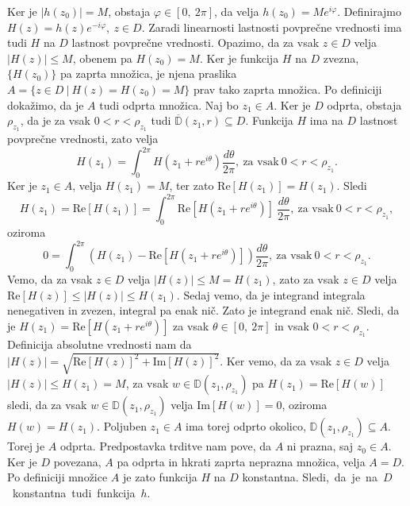 \documentclass[mat1, tisk]{fmfdelo}
\begin{document}
    \begin{dokaz}
        Ker je $|h(z_0)| = M$, obstaja $\varphi \in [0,~2\pi]$, da velja \mbox{$h(z_0) = M e^{i \varphi}$}.
        Definirajmo $H(z) = h(z) e^{-i\varphi},~z \in D$. Zaradi linearnosti lastnosti povprečne vrednosti ima tudi $H$ na $D$ lastnost povprečne vrednosti. Opazimo, da za vsak $z \in D$ velja $|H(z)|  \leq M$, obenem pa \mbox{$H(z_0) = M$}.
        Ker je funkcija $H$ na $D$ zvezna, $\{H(z_0)\}$ pa zaprta množica, je njena praslika \mbox{$A = \{z \in D~|~H(z) = H(z_0) = M\}$} prav tako zaprta množica. Po definiciji dokažimo, da je $A$ tudi odprta množica. 
        Naj bo $z_1 \in A$. Ker je $D$ odprta, obstaja $\rho_{z_1}$, da je za vsak $0 < r < \rho_{z_1}$ tudi $\overline{\mathbb{D}}(z_1, r) \subseteq D$. 
        Funkcija $H$ ima na $D$ lastnost povprečne vrednosti, zato velja
        $$
            H(z_1) = \int_{0}^{2\pi}{H(z_1 + re^{i\theta}) \frac{d\theta}{2\pi}},~\text{za vsak}~0<r<\rho_{z_1}.
        $$
        Ker je $z_1 \in A$, velja $H(z_1) = M$, ter zato $\text{Re}[H(z_1)] = H(z_1)$. 
        Sledi
        $$
        H(z_1) = \text{Re}[H(z_1)] = \int_{0}^{2\pi}{\text{Re}[H(z_1 + re^{i\theta})]~\frac{d\theta}{2\pi}},~\text{za vsak}~0<r<\rho_{z_1},
        $$
        oziroma
        $$
        0 = \int_{0}^{2\pi}{\left(H(z_1) - \text{Re}[H(z_1 + re^{i\theta})] \right)\frac{d\theta}{2\pi}},~\text{za vsak}~0<r<\rho_{z_1}.
        $$
        Vemo, da za vsak $z \in D$ velja $|H(z)| \leq M = H(z_1)$, zato za vsak $z \in D$ velja $\text{Re}[H(z)] \leq |H(z)| \leq H(z_1)$.
        Sedaj vemo, da je integrand integrala nenegativen in zvezen, integral pa enak nič. Zato je integrand enak nič. 
        Sledi, da je \mbox{$H(z_1) = \text{Re}[H(z_1 + r e^{i \theta})]$} za vsak $\theta \in [0,~2\pi]$ in vsak $0 < r < \rho_{z_1}$. Definicija absolutne vrednosti nam da $|H(z)| = \sqrt{\text{Re}[H(z)]^2 + \text{Im}[H(z)]^2}$. 
        Ker vemo, da za vsak $z \in D$ velja $|H(z)| \leq H(z_1) = M$, za vsak $w \in \mathbb{D}(z_1,\rho_{z_1})$ pa $H(z_1) = \text{Re}[H(w)]$ sledi, da za vsak $w \in \mathbb{D}(z_1,\rho_{z_1})$ velja $\text{Im}[H(w)] = 0$, oziroma $H(w) = H(z_1)$. 
        Poljuben $z_1 \in A$ ima torej odprto okolico, $ \mathbb{D}(z_1, \rho_{z_1}) \subseteq A$. Torej je $A$ odprta.
        Predpostavka trditve nam pove, da $A$ ni prazna, saj $z_0 \in A$. Ker je $D$ povezana, $A$ pa odprta in hkrati zaprta neprazna množica, velja $A = D$. 
        Po definiciji množice $A$ je zato funkcija $H$ na $D$ konstantna. \mbox{Sledi, da je na $D$ konstantna tudi funkcija $h$.} 
    \end{dokaz}
\end{document}
